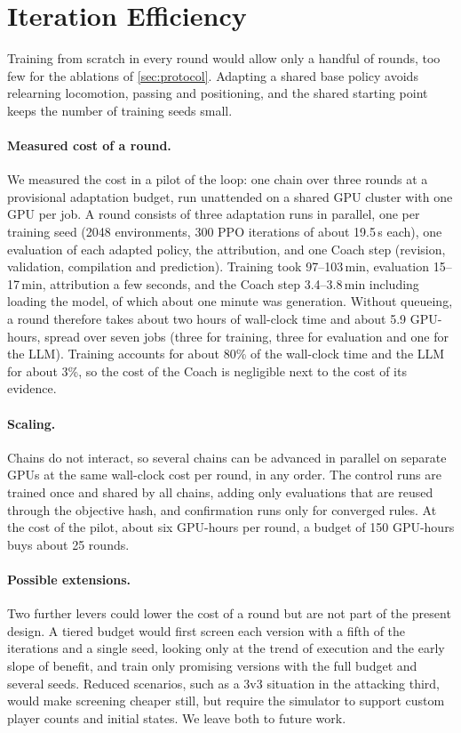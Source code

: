 \documentclass[11pt]{article}
\begin{document}
\section{Iteration Efficiency}
\label{sec:efficiency}

Training from scratch in every round would allow only a handful of rounds, too few for the ablations of \cref{sec:protocol}.
Adapting a shared base policy avoids relearning locomotion, passing and positioning, and the shared starting point keeps the number of training seeds small.

\paragraph{Measured cost of a round.}
We measured the cost in a pilot of the loop: one chain over three rounds at a provisional adaptation budget, run unattended on a shared GPU cluster with one GPU per job.
A round consists of three adaptation runs in parallel, one per training seed (2048 environments, 300 PPO iterations of about 19.5\,s each), one evaluation of each adapted policy, the attribution, and one Coach step (revision, validation, compilation and prediction).
Training took 97--103\,min, evaluation 15--17\,min, attribution a few seconds, and the Coach step 3.4--3.8\,min including loading the model, of which about one minute was generation.
Without queueing, a round therefore takes about two hours of wall-clock time and about 5.9 GPU-hours, spread over seven jobs (three for training, three for evaluation and one for the LLM).
Training accounts for about 80\% of the wall-clock time and the LLM for about 3\%, so the cost of the Coach is negligible next to the cost of its evidence.

\paragraph{Scaling.}
Chains do not interact, so several chains can be advanced in parallel on separate GPUs at the same wall-clock cost per round, in any order.
The control runs are trained once and shared by all chains, adding only evaluations that are reused through the objective hash, and confirmation runs only for converged rules.
At the cost of the pilot, about six GPU-hours per round, a budget of 150 GPU-hours buys about 25 rounds.

\paragraph{Possible extensions.}
Two further levers could lower the cost of a round but are not part of the present design.
A tiered budget would first screen each version with a fifth of the iterations and a single seed, looking only at the trend of execution and the early slope of benefit, and train only promising versions with the full budget and several seeds.
Reduced scenarios, such as a 3v3 situation in the attacking third, would make screening cheaper still, but require the simulator to support custom player counts and initial states.
We leave both to future work.
\end{document}
